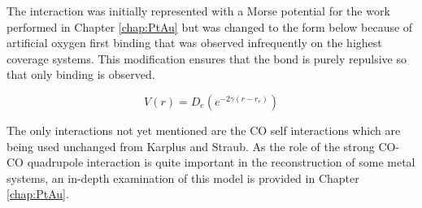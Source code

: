 The  interaction was initially represented with a Morse
potential for the work performed in Chapter \ref{chap:PtAu} but was changed to
the form below because of artificial oxygen first binding that was observed
infrequently on the highest coverage systems. This modification ensures that
the  bond is purely repulsive so that only 
binding is observed.

\begin{equation}
V(r) = D_e(e^{-2\gamma(r-r_e)})
\end{equation}

The only interactions not yet mentioned are the CO self
interactions which are being used unchanged from Karplus and
Straub.\citep{Straub:1991no} As the role of the strong CO-CO quadrupole
interaction is quite important in the reconstruction of some metal
systems,\citep{Tao:2010aa, Eren:2016qt} an in-depth examination of this model
is provided in Chapter \ref{chap:PtAu}.

